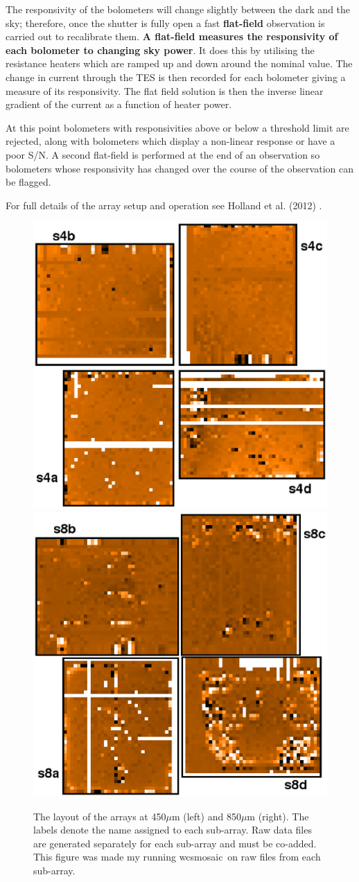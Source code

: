 \documentclass[twoside,11pt]{article}
\newcommand{\xref}[3]{#1}
\renewcommand{\_}{\texttt{\symbol{95}}}
\newcommand{\task}[1]{\textsf{#1}}
\newcommand{\wcsmosaic}{\xref{\task{wcsmosaic}}{sun95}{WCSMOSAIC}}
\begin{document}
The responsivity of the bolometers will change slightly between the
dark and the sky; therefore, once the shutter is fully open a fast
\textbf{flat-field} observation is carried out to recalibrate them.
\textbf{A flat-field measures the responsivity of each bolometer to
changing sky power}. It does this by utilising the resistance heaters
which are ramped up and down around the nominal value. The change in
current through the TES is then recorded for each bolometer giving a
measure of its responsivity. The flat field solution is then the
inverse linear gradient of the current as a function of heater power.

At this point bolometers with responsivities above or below a
threshold limit are rejected, along with bolometers which display a
non-linear response or have a poor S/N.  A second flat-field is
performed at the end of an observation so bolometers whose
responsivity has changed over the course of the observation can be
flagged.

For full details of the array setup and operation see Holland et al.
(2012) \cite{s2main}.

\begin{figure}[t!]
\begin{center}
\includegraphics[width=0.4\linewidth]{sc21_450array.eps}
\hspace{1cm}
\includegraphics[width=0.4\linewidth]{sc21_850array.eps}
\label{fig:arrays}
\caption{\small The layout of the arrays at 450$\mu$m (left) and
850$\mu$m (right). The labels denote the name assigned to each
sub-array. Raw data files are generated separately for each sub-array
and must be co-added. This figure was made my running \wcsmosaic\ on
raw files from each sub-array.}
\end{center}
\end{figure}
\end{document}
